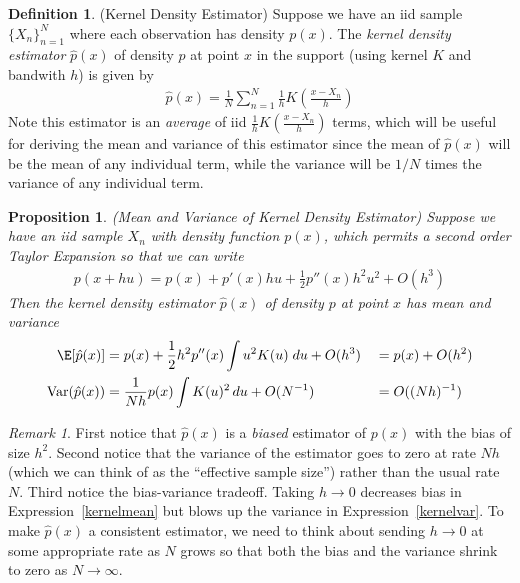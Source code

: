 \documentclass[12pt]{article}
\theoremstyle{plain}
\newtheorem{prop}[thm]{Proposition}
\theoremstyle{definition}
\newtheorem{defn}[thm]{Definition}
\theoremstyle{remark}
\newtheorem*{rmk}{Remark}
\newcommand{\ra}{\rightarrow}
\newcommand{\Var}{\operatorname{Var}}
\newcommand{\sumnN}{\sum^N_{n=1}}
\newcommand{\nN}{_{n=1}^N}
\begin{document}
\begin{defn}(Kernel Density Estimator)
Suppose we have an iid sample $\{X_n\}\nN$ where each observation has
density $p(x)$.
The \emph{kernel density estimator} $\hat{p}(x)$ of density $p$ at point
$x$ in the support (using kernel $K$ and bandwith $h$) is given by
\begin{align}
  \hat{p}(x)
  =
  \frac{1}{N}
  \sumnN
  \frac{1}{h}
  K\left(
  \frac{x-X_n}{h}
  \right)
  \label{kernel}
\end{align}
Note this estimator is an \emph{average} of iid
$\frac{1}{h} K\left( \frac{x-X_n}{h} \right)$ terms, which will be
useful for deriving the mean and variance of this estimator since
the mean of $\hat{p}(x)$ will be the mean of any individual term, while
the variance will be $1/N$ times the variance of any individual term.
\end{defn}

\begin{prop}\emph{(Mean and Variance of Kernel Density Estimator)}
Suppose we have an iid sample $X_n$ with density function $p(x)$, which
permits a second order Taylor Expansion so that we can write
\begin{align}
  p(x+hu)
  =
  p(x)
  + p'(x) hu
  + \frac{1}{2}p''(x)h^2u^2
  + O(h^3)
  \label{kerneltaylor1}
\end{align}
Then the kernel density estimator $\hat{p}(x)$ of density $p$ at point
$x$ has mean and variance
\begin{alignat}{3}
  \E[\hat{p}(x)]
  &=
  p(x)
  +
  \frac{1}{2}
  h^2
  p''(x)
  \int
  u^2
  K(u)
  \;du
  + O(h^3)
  &&=
  p(x) + O(h^2)
  \label{kernelmean}
  \\
  \Var(\hat{p}(x))
  &=
  \frac{1}{Nh}
  p(x)
  \int
  K(u)^2
  \,
  du
  + O(N^{-1})
  &&=
  O((Nh)^{-1})
  \label{kernelvar}
\end{alignat}
\end{prop}
\begin{rmk}
First notice that $\hat{p}(x)$ is a \emph{biased} estimator of $p(x)$
with the bias of size $h^2$.
Second notice that the variance of the estimator goes to zero at rate
$Nh$ (which we can think of as the ``effective sample size'') rather
than the usual rate $N$.
Third notice the bias-variance tradeoff.
Taking $h\ra 0$ decreases bias in Expression~\ref{kernelmean} but
blows up the variance in Expression~\ref{kernelvar}.
To make $\hat{p}(x)$ a consistent estimator, we need to think about
sending $h\ra 0$ at some appropriate rate as $N$ grows so that both the
bias and the variance shrink to zero as $N\ra\infty$.
\end{rmk}
\end{document}
